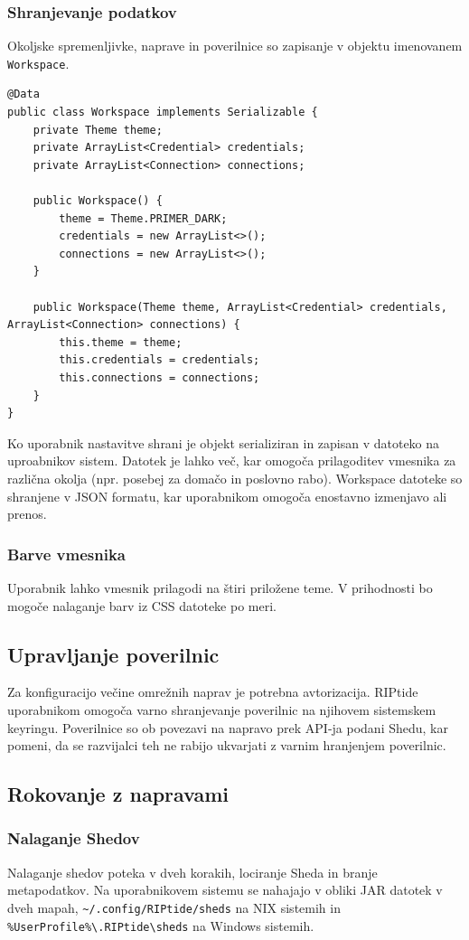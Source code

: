 \documentclass[12pt]{article}
\begin{document}
\subsubsection{Shranjevanje podatkov}
Okoljske spremenljivke, naprave in poverilnice so zapisanje v objektu
imenovanem \verb|Workspace|.

\begin{lstlisting}
@Data
public class Workspace implements Serializable {
	private Theme theme;
	private ArrayList<Credential> credentials;
	private ArrayList<Connection> connections;

	public Workspace() {
		theme = Theme.PRIMER_DARK;
		credentials = new ArrayList<>();
		connections = new ArrayList<>();
	}

	public Workspace(Theme theme, ArrayList<Credential> credentials, ArrayList<Connection> connections) {
		this.theme = theme;
		this.credentials = credentials;
		this.connections = connections;
	}
}
\end{lstlisting}
Ko uporabnik nastavitve shrani je objekt serializiran in zapisan v datoteko
na uproabnikov sistem. Datotek je lahko več, kar omogoča prilagoditev
vmesnika za različna okolja (npr. posebej za domačo in poslovno rabo).
Workspace datoteke so shranjene v JSON formatu, kar uporabnikom omogoča
enostavno izmenjavo ali prenos.

\subsubsection{Barve vmesnika}
Uporabnik lahko vmesnik prilagodi na štiri priložene teme. V prihodnosti
bo mogoče nalaganje barv iz CSS datoteke po meri.

\subsection{Upravljanje poverilnic}
Za konfiguracijo večine omrežnih naprav je potrebna avtorizacija.
RIPtide uporabnikom omogoča varno shranjevanje poverilnic na njihovem
sistemskem keyringu. Poverilnice so ob povezavi na napravo prek API-ja
podani Shedu, kar pomeni, da se razvijalci teh ne rabijo ukvarjati z
varnim hranjenjem poverilnic.

\subsection{Rokovanje z napravami}
\subsubsection{Nalaganje Shedov}
Nalaganje shedov poteka v dveh korakih, lociranje Sheda in branje
metapodatkov. Na uporabnikovem sistemu se nahajajo v obliki JAR datotek v
dveh mapah, \verb|~/.config/RIPtide/sheds| na NIX sistemih in
\verb|%UserProfile%\.RIPtide\sheds| na Windows sistemih.
\end{document}
